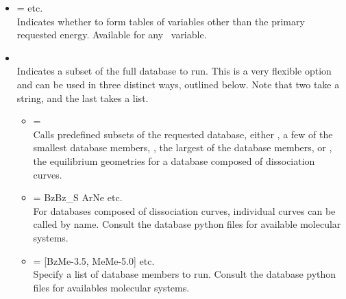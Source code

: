 \begin{itemize}
\item {} = \textit{\pyoptionval{[]}} \textbar\; {} \textbar\; etc. \\
Indicates whether to form tables of variables other than the primary requested energy. 
Available for any \PSI\ variable.

\item {} \\
Indicates a subset of the full database to run. This is a very flexible option and can be used in
three distinct ways, outlined below. Note that two take a string, and the last takes a list.
\begin{itemize}
\item {} =  \textbar\;  \textbar\;  \\
Calls predefined subsets of the requested database, either , a few
of the smallest database members, , the largest of the database members,
or , the equilibrium geometries for a database composed of
dissociation curves.
\item {} = \textsf{\qq BzBz\_S\qq} \textbar\; \textsf{\qq ArNe\qq} \textbar\; etc. \\
For databases composed of dissociation curves, individual curves can be called by name.
Consult the database python files for available molecular systems.
\item {} = \pyoptionval{[1,2,5]} \textbar\; \pyoptionval{[\qq 1\qq, \qq 2\qq, \qq 5\qq]} \textbar\; \textsf{[\qq BzMe-3.5\qq, \qq MeMe-5.0\qq]} \textbar\; etc. \\
Specify a list of database members to run. Consult the database python files for availables
molecular systems.
\end{itemize}
\end{itemize}


